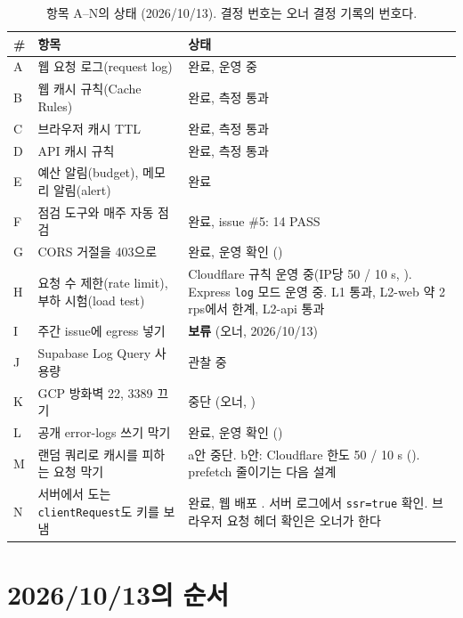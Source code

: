 \begin{table}[H]
  \caption{항목 A--N의 상태 (2026/10/13). 결정 번호는 오너 결정 기록의 번호다.}
  \label{tab:status}
  \centering\small
  \begin{tabularx}{\linewidth}{@{}L{0.8cm}L{5.2cm}Y@{}}
    \toprule
    \# & 항목 & 상태 \\
    \midrule
    A & 웹 요청 로그(request log) & 완료, 운영 중 \\
    \midrule
    B & 웹 캐시 규칙(Cache Rules) & 완료, 측정 통과 \\
    \midrule
    C & 브라우저 캐시 TTL & 완료, 측정 통과 \\
    \midrule
    D & API 캐시 규칙 & 완료, 측정 통과 \\
    \midrule
    E & 예산 알림(budget), 메모리 알림(alert) & 완료 \\
    \midrule
    F & 점검 도구와 매주 자동 점검 & 완료, issue \#5: 14 PASS \\
    \midrule
    G & CORS 거절을 403으로 & 완료, 운영 확인 () \\
    \midrule
    H & 요청 수 제한(rate limit), 부하 시험(load test) & Cloudflare 규칙 운영 중(IP당 50 / 10 s, ). Express \texttt{log} 모드 운영 중. L1 통과, L2-web 약 2 rps에서 한계, L2-api 통과 \\
    \midrule
    I & 주간 issue에 egress 넣기 & \textbf{보류} (오너, 2026/10/13) \\
    \midrule
    J & Supabase Log Query 사용량 & 관찰 중 \\
    \midrule
    K & GCP 방화벽 22, 3389 끄기 & 중단 (오너, ) \\
    \midrule
    L & 공개 error-logs 쓰기 막기 & 완료, 운영 확인 () \\
    \midrule
    M & 랜덤 쿼리로 캐시를 피하는 요청 막기 & a안 중단. b안: Cloudflare 한도 50 / 10 s (). prefetch 줄이기는 다음 설계 \\
    \midrule
    N & 서버에서 도는 \texttt{clientRequest}도 키를 보냄 & 완료, 웹 배포 . 서버 로그에서 \texttt{ssr=true} 확인. 브라우저 요청 헤더 확인은 오너가 한다 \\
    \bottomrule
  \end{tabularx}
\end{table}

\section{2026/10/13의 순서}\label{sec:ov-timeline}

